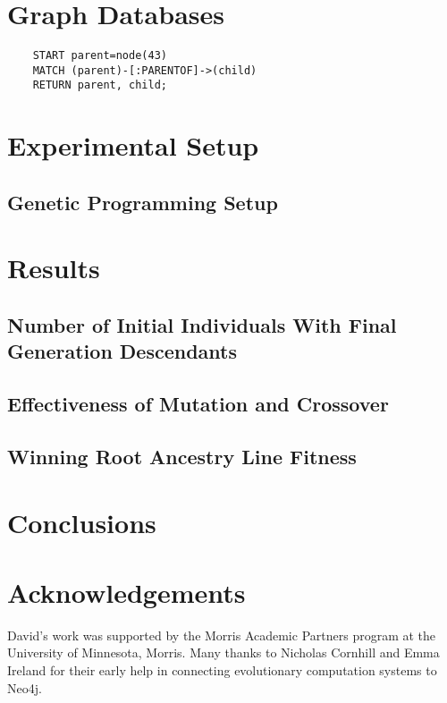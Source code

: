 \documentclass[12pt]{article}
\begin{document}
\section{Graph Databases}
\label{sec:Graph Databases}



\begin{verbatim}
    START parent=node(43)
    MATCH (parent)-[:PARENTOF]->(child)
    RETURN parent, child;
\end{verbatim}


\section{Experimental Setup} 
\label{sec:experiments}


\subsection{Genetic Programming Setup}
\label{sec:GPSetup}


\section{Results} \label{sec:results}



\subsection{Number of Initial Individuals With Final Generation Descendants}
\label{sec:numberInitialIndividualsWithDescendants}



\subsection{Effectiveness of Mutation and Crossover}
\label{sec:effectivenessMutationCrossover}



\subsection{Winning Root Ancestry Line Fitness}
\label{sec:WinningRootLineFitness}


\section{Conclusions} \label{sec:conclusion}



\section*{Acknowledgements}

David's work was supported by the Morris Academic Partners program at the University of Minnesota, Morris. Many thanks to Nicholas Cornhill and Emma Ireland for their early help in connecting evolutionary computation systems to Neo4j.

\pagebreak



\end{document}
